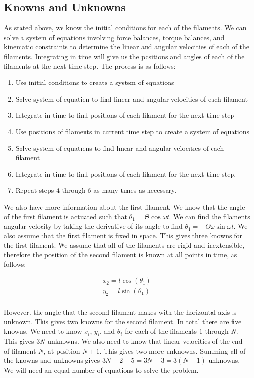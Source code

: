 \documentclass[12pt,letterpaper,titlepage]{article}
\begin{document}
\subsection{Knowns and Unknowns}
As stated above, we know the initial conditions for each of the filaments. We can solve a system of equations involving force balances, torque balances, and kinematic constraints to determine the linear and angular velocities of each of the filaments. Integrating in time will give us the positions and angles of each of the filaments at the next time step. The process is as follows:
\begin{enumerate} \itemsep -2pt
\item Use initial conditions to create a system of equations
\item Solve system of equation to find linear and angular velocities of each filament
\item Integrate in time to find positions of each filament for the next time step
\item Use positions of filaments in current time step to create a system of equations
\item Solve system of equations to find linear and angular velocities of each filament
\item Integrate in time to find positions of each filament for the next time step.
\item Repeat steps 4 through 6 as many times as necessary.
\end{enumerate}

\newpage

We also have more information about the first filament. We know that the angle of the first filament is actuated such that $\theta_1 = \Theta \cos \omega t$. We can find the filaments angular velocity by taking the derivative of its angle to find $\dot{\theta}_1 = - \Theta \omega \sin \omega t$. We also assume that the first filament is fixed in space. This gives three knowns for the first filament. We assume that all of the filaments are rigid and inextensible, therefore the position of the second filament is known at all points in time, as follows:

\begin{align*}
x_2 = l \cos(\theta_1)\\
y_2 = l \sin(\theta_1)\\
\end{align*}

However, the angle that the second filament makes with the horizontal axis is unknown. This gives two knowns for the second filament. In total there are five knowns. We need to know $\dot{x}_i$, $\dot{y}_i$, and $\dot{\theta}_i$ for each of the filaments $1$ through $N$. This gives $3N$ unknowns. We also need to know that linear velocities of the end of filament $N$, at position $N+1$. This gives two more unknowns. Summing all of the knowns and unknowns gives $3N + 2 - 5 = 3N-3 = 3(N-1)$ unknowns. We will need an equal number of equations to solve the problem.
\end{document}
